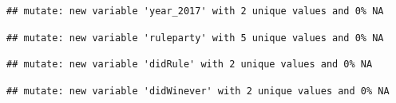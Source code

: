 \documentclass[
]{article}
\newenvironment{Shaded}{\begin{snugshade}}{\end{snugshade}}
\newcommand{\DataTypeTok}[1]{\textcolor[rgb]{0.13,0.29,0.53}{#1}}
\newcommand{\DecValTok}[1]{\textcolor[rgb]{0.00,0.00,0.81}{#1}}
\newcommand{\KeywordTok}[1]{\textcolor[rgb]{0.13,0.29,0.53}{\textbf{#1}}}
\newcommand{\NormalTok}[1]{#1}
\newcommand{\OperatorTok}[1]{\textcolor[rgb]{0.81,0.36,0.00}{\textbf{#1}}}
\newcommand{\StringTok}[1]{\textcolor[rgb]{0.31,0.60,0.02}{#1}}
\begin{document}
\begin{verbatim}
## mutate: new variable 'year_2017' with 2 unique values and 0% NA
\end{verbatim}

\begin{Shaded}
\end{Shaded}

\begin{verbatim}
## mutate: new variable 'ruleparty' with 5 unique values and 0% NA
\end{verbatim}

\begin{Shaded}
\end{Shaded}

\begin{verbatim}
## mutate: new variable 'didRule' with 2 unique values and 0% NA
\end{verbatim}

\begin{Shaded}
\end{Shaded}

\begin{verbatim}
## mutate: new variable 'didWinever' with 2 unique values and 0% NA
\end{verbatim}

\begin{Shaded}
\end{Shaded}
\end{document}
